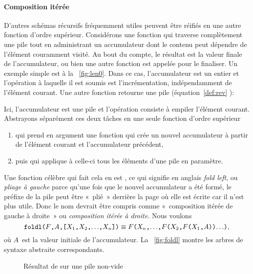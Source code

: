 \paragraph{Composition itérée}
\label{par:folds}

D'autres schémas récursifs fréquemment utiles peuvent être réifiés en
une autre fonction d'ordre supérieur. Considérons une fonction qui
traverse complètement une pile tout en administrant un accumulateur
dont le contenu peut dépendre de l'élément couramment visité. Au bout
du compte, le résultat est la valeur finale de l'accumulateur, ou bien
une autre fonction est appelée pour le finaliser. Un exemple simple
est  à la \fig~\vref{fig:len0}. Dans ce cas,
l'accumulateur est un entier et l'opération à laquelle il est soumis
est l'incrémentation, indépendamment de l'élément courant. Une autre
fonction retourne une pile (équation~\eqref{def:rev}
):

Ici, l'accumulateur est une pile et l'opération consiste à empiler
l'élément courant. Abstrayons séparément ces deux tâches en une seule
fonction d'ordre supérieur
\begin{enumerate}

  \item qui prend en argument une fonction qui crée un nouvel
  accumulateur à partir de l'élément courant et l'accumulateur
  précédent,

  \item puis qui applique à celle-ci tous les éléments d'une pile en
  paramètre.

\end{enumerate}
Une fonction célèbre qui fait cela en \Erlang est ,
ce qui signifie en anglais \emph{fold left}, ou \emph{pliage à gauche}
parce qu'une fois que le nouvel accumulateur a été formé, le préfixe
de la pile peut être «~plié~» derrière la page où elle est écrite car il
n'est plus utile. Donc le nom devrait être compris comme «~composition
itérée de gauche à droite~» ou \emph{composition itérée à droite}. Nous
voulons
\begin{equation*}
\texttt{foldl(\(F\),\(A\),[\(X_1\),\(X_2\),\(\ldots\),\(X_{n}\)])}
\equiv
\texttt{\(F\)(\(X_{n}\),\(\ldots\),\(F\)(\(X_2\),\(F\)(\(X_1\),\(A\)))\(\ldots\))},
\end{equation*}
où \(A\)~est la valeur initiale de l'accumulateur. La
\fig~\vref{fig:foldl} montre les arbres de syntaxe abstraite
correspondants.
\begin{figure}
\centering
{}
\qquad
{}
\caption{Résultat de  sur une pile non-vide}
\label{fig:foldl}
\end{figure}

